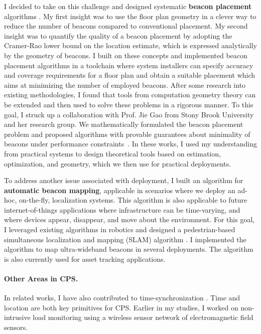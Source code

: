 \documentclass[10pt]{article}
\begin{document}
I decided to take on this challenge and designed systematic {\bf beacon placement} algorithms \cite{rajagopal2016beacon}. 
My first insight was to use the floor plan geometry in a clever way to reduce the number of beacons compared to conventional placement. 
My second insight was to quantify the quality of a beacon placement by adopting the Cramer-Rao lower bound on the location estimate, which is expressed analytically by the geometry of beacons. I built on these concepts and implemented beacon placement algorithms in a toolchain where system installers can specify accuracy and coverage requirements for a floor plan and obtain a suitable placement which aims at minimizing the number of employed beacons.
After some research into existing methodologies, I found that tools from computation geometry theory can be extended and then used to solve these problems in a rigorous manner.  To this goal, I struck up a collaboration with Prof. Jie Gao from Stony Brook University and her research group. We mathematically formulated the beacon placement problem and proposed algorithms with provable guarantees about minimality of beacons under performance constraints~\cite{beaconplacementtheory}.  In these works, I used my understanding from practical systems to design theoretical tools based on estimation, optimization, and geometry, which we then use for practical deployments.

To address another issue associated with deployment, I built an algorithm for {\bf automatic beacon mapping}, applicable in scenarios where we deploy an ad-hoc, on-the-fly, localization systems. This algorithm is also applicable to future internet-of-things applications where infrastructure can be time-varying, and where devices appear, disappear, and move about the environment. %
For this goal, I leveraged existing algorithms in robotics and designed a pedestrian-based simultaneous localization and mapping (SLAM) algorithm \cite{mobileAR}. I implemented the algorithm to map ultra-wideband beacons in several deployments. The algorithm is also currently used for asset tracking applications.


\paragraph{Other Areas in CPS. }
In related works, I have also contributed to time-synchronization \cite{buevich2013hardware, dongare2017pulsar}. Time and location are both key primitives for CPS. 
Earlier in my studies, I worked on non-intrusive load monitoring \cite{rajagopal2013magnetic, rajagopal2013demo} using a wireless sensor network of electromagnetic field sensors. 
\end{document}
